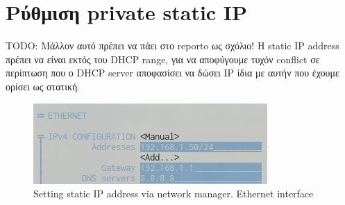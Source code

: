 \documentclass[12pt, a4paper]{article}
\begin{document}
\pagebreak
\section{Ρύθμιση private static IP}
TODO: Μάλλον αυτό πρέπει να πάει στο reporto ως σχόλιο!
Η static IP address πρέπει να είναι εκτός του DHCP range, για να αποφύγουμε τυχόν conflict σε περίπτωση που ο DHCP server αποφασίσει να δώσει IP ίδια με αυτήν που έχουμε ορίσει ως στατική.

\begin{figure}[h!]
    \centering
    \includegraphics[height=.3\textheight, width=\textwidth, keepaspectratio]{assets/router/static.png}
    \caption{Setting static IP address via network manager. Ethernet interface} 
    \label{fig:static}
\end{figure}
\end{document}
